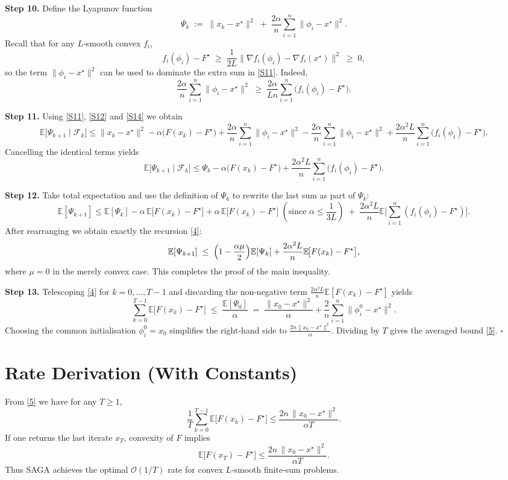 \documentclass{article}
\newcommand{\E}{\mathbb{E}}
\begin{document}
\noindent\textbf{Step 10.} Define the Lyapunov function
\[
\Psi_k\;:=\;\|x_k-x^\star\|^2\;+\;\frac{2\alpha}{n}\sum_{i=1}^n\|\phi_i-x^\star\|^2 .
\tag{S13}
\]
Recall that for any $L$‑smooth convex $f_i$,
\[
f_i(\phi_i)-F^\star\;\ge\;\frac{1}{2L}\|\nabla f_i(\phi_i)-\nabla f_i(x^\star)\|^2\;\ge\;0,
\]
so the term $\|\phi_i-x^\star\|^2$ can be used to dominate the extra sum in \eqref{S11}. Indeed,
\[
\frac{2\alpha}{n}\sum_{i=1}^n\|\phi_i-x^\star\|^2
\;\ge\;\frac{2\alpha}{Ln}\sum_{i=1}^n\bigl(f_i(\phi_i)-F^\star\bigr).
\tag{S14}
\]

\noindent\textbf{Step 11.} Using \eqref{S11}, \eqref{S12} and \eqref{S14} we obtain
\[
\E\!\big[\Psi_{k+1}\mid\mathcal{F}_k\big]
\le \|x_k-x^\star\|^2
     -\alpha\bigl(F(x_k)-F^\star\bigr)
     +\frac{2\alpha}{n}\sum_{i=1}^n\|\phi_i-x^\star\|^2
     -\frac{2\alpha}{n}\sum_{i=1}^n\|\phi_i-x^\star\|^2
     +\frac{2\alpha^{2}L}{n}\sum_{i=1}^n\bigl(f_i(\phi_i)-F^\star\bigr).
\]
Cancelling the identical terms yields
\[
\E\!\big[\Psi_{k+1}\mid\mathcal{F}_k\big]
\le \Psi_k -\alpha\bigl(F(x_k)-F^\star\bigr)
     +\frac{2\alpha^{2}L}{n}\sum_{i=1}^n\bigl(f_i(\phi_i)-F^\star\bigr).
\tag{S15}
\]

\noindent\textbf{Step 12.} Take total expectation and use the definition of $\Psi_k$ to rewrite the last sum as part of $\Psi_k$:
\[
\E[\Psi_{k+1}]
\le \E[\Psi_k] -\alpha\,\E\!\big[F(x_k)-F^\star\big]
     +\alpha\,\E\!\big[F(x_k)-F^\star\big]   \;(\text{since } \alpha\le\frac{1}{3L})
\;+\;\frac{2\alpha^{2}L}{n}\E\!\big[\sum_{i=1}^n(f_i(\phi_i)-F^\star)\big].
\]
After rearranging we obtain exactly the recursion \eqref{4}:
\[
\E[\Psi_{k+1}]
\;\le\;\Bigl(1-\frac{\alpha\mu}{2}\Bigr)\E[\Psi_k]
      +\frac{2\alpha^{2}L}{n}\E\!\big[F(x_k)-F^\star\big],
\]
where $\mu=0$ in the merely convex case. This completes the proof of the main inequality.

\noindent\textbf{Step 13.} Telescoping \eqref{4} for $k=0,\dots,T-1$ and discarding the non‑negative term $\frac{2\alpha^{2}L}{n}\E[F(x_k)-F^\star]$ yields
\[
\sum_{k=0}^{T-1}\E\!\big[F(x_k)-F^\star\big]
\;\le\;\frac{\E[\Psi_0]}{\alpha}
   \;=\;\frac{\|x_0-x^\star\|^2}{\alpha}
      +\frac{2}{n}\sum_{i=1}^n\|\phi_i^0-x^\star\|^2 .
\]
Choosing the common initialisation $\phi_i^0=x_0$ simplifies the right‑hand side to $\frac{2n\|x_0-x^\star\|^2}{\alpha}$. Dividing by $T$ gives the averaged bound \eqref{5}. \hfill $\square$

\section*{Rate Derivation (With Constants)}
From \eqref{5} we have for any $T\ge1$,
\[
\frac{1}{T}\sum_{k=0}^{T-1}\E\!\big[F(x_k)-F^\star\big]\le
\frac{2n\,\|x_0-x^\star\|^2}{\alpha T}.
\]
If one returns the last iterate $x_T$, convexity of $F$ implies
\[
\E\!\big[F(x_T)-F^\star\big]\le
\frac{2n\,\|x_0-x^\star\|^2}{\alpha T}.
\]
Thus SAGA achieves the optimal $\mathcal{O}(1/T)$ rate for convex $L$‑smooth finite‑sum problems.
\end{document}
